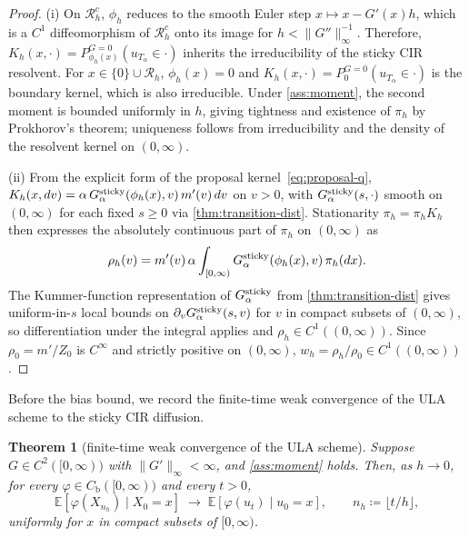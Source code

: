 \documentclass[aap,preprint]{imsart}
\numberwithin{equation}{section}
\theoremstyle{plain}
\newtheorem{theorem}{Theorem}[section]
\theoremstyle{definition}
\begin{document}
\begin{proof}
\textup{(i)} On $\mathcal{R}_h^c$, $\phi_h$ reduces to the smooth Euler step $x \mapsto x - G'(x)h$, which is a $C^1$ diffeomorphism of $\mathcal{R}_h^c$ onto its image for $h < \|G''\|_\infty^{-1}$. Therefore, $K_h(x,\cdot) = P_{\phi_h(x)}^{G=0}(u_{T_\alpha}\in\cdot)$ inherits the irreducibility of the sticky CIR resolvent. For $x \in \{0\}\cup\mathcal{R}_h$, $\phi_h(x) = 0$ and $K_h(x,\cdot) = P_0^{G=0}(u_{T_\alpha}\in\cdot)$ is the boundary kernel, which is also irreducible.  Under \cref{ass:moment}, the second moment is bounded uniformly in $h$, giving tightness and existence of $\pi_h$ by Prokhorov's theorem; uniqueness follows from irreducibility and the density of the resolvent kernel on $(0,\infty)$.

\textup{(ii)} From the explicit form of the proposal kernel~\eqref{eq:proposal-q}, $K_h(x,dv) = \alpha\,G^{\rm sticky}_\alpha(\phi_h(x), v)\,m'(v)\,dv$ on $v > 0$, with $G^{\rm sticky}_\alpha(s,\cdot)$ smooth on $(0,\infty)$ for each fixed $s \ge 0$ via \cref{thm:transition-dist}.  Stationarity $\pi_h = \pi_h K_h$ then expresses the absolutely continuous part of $\pi_h$ on $(0,\infty)$ as
\[
  \rho_h(v)  =  m'(v)\,\alpha\int_{[0,\infty)} G^{\rm sticky}_\alpha(\phi_h(x), v)\,\pi_h(dx).
\]
The Kummer-function representation of $G^{\rm sticky}_\alpha$ from \cref{thm:transition-dist} gives uniform-in-$s$ local bounds on $\partial_v G^{\rm sticky}_\alpha(s,v)$ for $v$ in compact subsets of $(0,\infty)$, so differentiation under the integral applies and $\rho_h \in C^1((0,\infty))$.  Since $\rho_0 = m'/Z_0$ is $C^\infty$ and strictly positive on $(0,\infty)$, $w_h = \rho_h/\rho_0 \in C^1((0,\infty))$.
\end{proof}

Before the bias bound, we record the finite-time weak convergence of the ULA scheme to the sticky CIR diffusion.

\begin{theorem}[finite-time weak convergence of the ULA scheme]\label{thm:ula-weak-conv}
  Suppose $G\in C^2([0,\infty))$ with $\|G'\|_\infty<\infty$, and \cref{ass:moment} holds.  Then, as $h\to 0$, for every $\varphi\in C_{\mathrm b}([0,\infty))$ and every $t>0$,
  \[
    \mathbb{E}[\varphi(X_{n_h})\mid X_0=x]
      \;\to\;
      \mathbb{E}[\varphi(u_t)\mid u_0=x],
      \qquad n_h \coloneqq  \lfloor t/h\rfloor,
  \]
  uniformly for $x$ in compact subsets of $[0,\infty)$.
\end{theorem}
\end{document}
